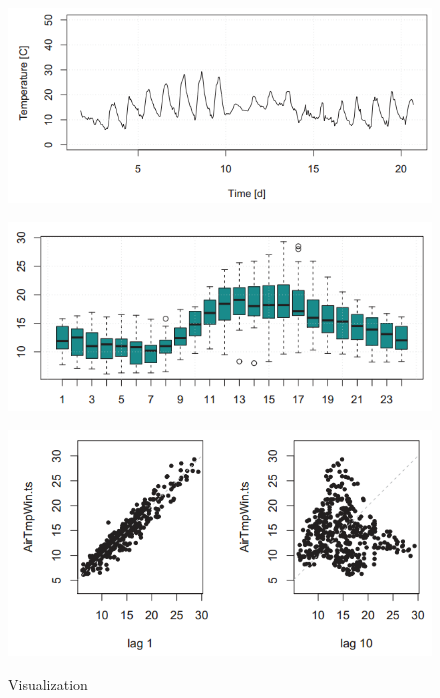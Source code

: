{{\begin{figure}[H]
\begin{minipage}[c]{0.42\textwidth}
		\label{Fig:tsAirTempFull}
	\end{minipage}
	\begin{minipage}[c]{0.42\textwidth}
		\includegraphics[width=1\linewidth]{images/tsAirTempDetail.png}
		\label{Fig:tsAirTempDetail}
	\end{minipage}
	\begin{minipage}[t]{.42\textwidth}
		\includegraphics[width=1\linewidth]{images/tsBoxPlot.png}
		\label{Fig:tsBoxPlot}
	\end{minipage}
	\begin{minipage}[t]{.42\textwidth}
		\includegraphics[width=1\linewidth]{images/tsLagPlot.png}
		\label{Fig:tsLagPlot}
	\end{minipage}
\caption{Visualization}
\end{figure}
}}
